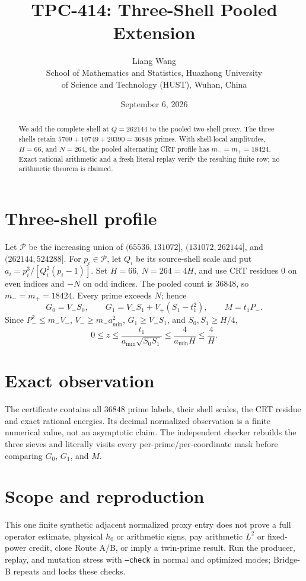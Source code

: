 \documentclass[11pt]{article}
\title{TPC-414: Three-Shell Pooled Extension}
\author{Liang Wang\\School of Mathematics and Statistics, Huazhong University\\of Science and Technology (HUST), Wuhan, China}
\date{September 6, 2026}
\begin{document}
\maketitle
\begin{abstract}
We add the complete shell at $Q=262144$ to the pooled two-shell proxy.  The
three shells retain $5709+10749+20390=36848$ primes.  With shell-local
amplitudes, $H=66$, and $N=264$, the pooled alternating CRT profile has
$m_-=m_+=18424$.  Exact rational arithmetic and a fresh literal replay verify
the resulting finite row; no arithmetic theorem is claimed.
\end{abstract}
\section{Three-shell profile}
Let $\mathcal P$ be the increasing union of $(65536,131072]$,
$(131072,262144]$, and $(262144,524288]$.  For $p_i\in\mathcal P$, let
$Q_i$ be its source-shell scale and put $a_i=p_i^3/[Q_i^2(p_i-1)]$.
Set $H=66$, $N=264=4H$, and use CRT residues $0$ on even indices and $-N$
on odd indices.  The pooled count is $36848$, so $m_-=m_+=18424$.
Every prime exceeds $N$; hence
\[
G_0=V_-S_0,\qquad G_1=V_-S_1+V_+(S_1-t_1^2),\qquad M=t_1P_-.
\]
Since $P_-^2\le m_-V_-$, $V_-\ge m_-a_{\min}^2$,
$G_1\ge V_-S_1$, and $S_0,S_1\ge H/4$,
\[
0\le z\le\frac{t_1}{a_{\min}\sqrt{S_0S_1}}\le\frac4{a_{\min}H}\le\frac4H.\tag{1}
\]
\section{Exact observation}
The certificate contains all $36848$ prime labels, their shell scales, the
CRT residue and exact rational energies.  Its decimal normalized observation
is a finite numerical value, not an asymptotic claim.  The independent checker
rebuilds the three sieves and literally visits every per-prime/per-coordinate
mask before comparing $G_0$, $G_1$, and $M$.
\section{Scope and reproduction}
This one finite synthetic adjacent normalized proxy entry does not prove a full
operator estimate, physical $h_0$ or arithmetic signs, pay arithmetic $L^2$ or
fixed-power credit, close Route A/B, or imply a twin-prime result.  Run the
producer, replay, and mutation stress with \texttt{--check} in normal and
optimized modes; Bridge-B repeats and locks these checks.
\end{document}
